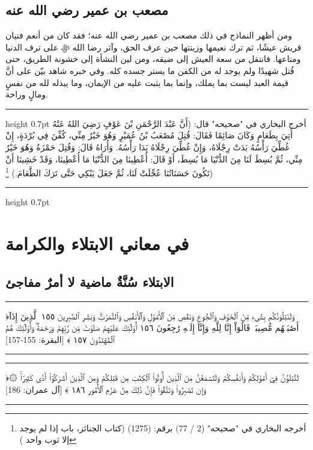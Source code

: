 \documentclass[12pt,openany]{book}
\newenvironment{quranblock}
  {\par\medskip\begin{center}\begin{minipage}{0.92\linewidth}\centering\quranfont\large\color{ink}\hrule\vspace{0.65em}}
  {\vspace{0.65em}\hrule\end{minipage}\end{center}\medskip}
\newenvironment{hadithblock}
  {\par\medskip\noindent\begin{minipage}{\linewidth}\hrule height 0.7pt \vspace{0.6em}\small}
  {\vspace{0.4em}\hrule height 0.7pt\end{minipage}\par\medskip}
\begin{document}
\section{مصعب بن عمير رضي الله عنه}
ومن أظهر النماذج في ذلك مصعب بن عمير رضي الله عنه؛ فقد كان من أنعم فتيان قريش عيشًا، ثم ترك نعيمها وزينتها حين عرف الحق، وآثر رضا الله ﷻ على ترف الدنيا ومتاعها. فانتقل من سعة العيش إلى ضيقه، ومن لين النشأة إلى خشونة الطريق، حتى قُتل شهيدًا ولم يوجد له من الكفن ما يستر جسده كله. وفي خبره شاهد بيّن على أنَّ قيمة العبد ليست بما يملك، وإنما بما يثبت عليه من الإيمان، وما يبذله لله من نفسٍ ومالٍ وراحة.

\begin{hadithblock}
أخرج البخاري في "صحيحه" قال: (أَنَّ عَبْدَ الرَّحْمَنِ بْنَ عَوْفٍ رَضِيَ اللهُ عَنْهُ أُتِيَ بِطَعَامٍ وَكَانَ صَائِمًا فَقَالَ: قُتِلَ مُصْعَبُ بْنُ عُمَيْرٍ وَهُوَ خَيْرٌ مِنِّي، كُفِّنَ فِي بُرْدَةٍ، إِنْ غُطِّيَ رَأْسُهُ بَدَتْ رِجْلَاهُ، وَإِنْ غُطِّيَ رِجْلَاهُ بَدَا رَأْسُهُ. وَأُرَاهُ قَالَ: وَقُتِلَ حَمْزَةُ وَهُوَ خَيْرٌ مِنِّي، ثُمَّ بُسِطَ لَنَا مِنَ الدُّنْيَا مَا بُسِطَ، أَوْ قَالَ: أُعْطِينَا مِنَ الدُّنْيَا مَا أُعْطِينَا، وَقَدْ خَشِينَا أَنْ تَكُونَ حَسَنَاتُنَا عُجِّلَتْ لَنَا، ثُمَّ جَعَلَ يَبْكِي حَتَّى تَرَكَ الطَّعَامَ.) \footnote{أخرجه البخاري في "صحيحه" (2 / 77) برقم: (1275) (كتاب الجنائز، باب إذا لم يوجد إلا ثوب واحد )})
\end{hadithblock}

\chapter{في معاني الابتلاء والكرامة}
\section{الابتلاء سُنَّةٌ ماضية لا أمرٌ مفاجئ}
\begin{quranblock}
﴿‌وَلَنَبۡلُوَنَّكُم بِشَيۡءٖ مِّنَ ٱلۡخَوۡفِ وَٱلۡجُوعِ وَنَقۡصٖ مِّنَ ٱلۡأَمۡوَٰلِ وَٱلۡأَنفُسِ وَٱلثَّمَرَٰتِۗ وَبَشِّرِ ٱلصَّٰبِرِينَ ١٥٥ ٱلَّذِينَ إِذَآ أَصَٰبَتۡهُم مُّصِيبَةٞ قَالُوٓاْ إِنَّا لِلَّهِ وَإِنَّآ إِلَيۡهِ رَٰجِعُونَ ١٥٦ أُوْلَٰٓئِكَ عَلَيۡهِمۡ صَلَوَٰتٞ مِّن رَّبِّهِمۡ وَرَحۡمَةٞۖ وَأُوْلَٰٓئِكَ هُمُ ٱلۡمُهۡتَدُونَ ١٥٧ ﴾ [البقرة: 155-157]
\end{quranblock}

\begin{quranblock}
﴿۞ لَتُبۡلَوُنَّ فِيٓ أَمۡوَٰلِكُمۡ وَأَنفُسِكُمۡ وَلَتَسۡمَعُنَّ مِنَ ٱلَّذِينَ أُوتُواْ ‌ٱلۡكِتَٰبَ مِن قَبۡلِكُمۡ وَمِنَ ٱلَّذِينَ أَشۡرَكُوٓاْ أَذٗى كَثِيرٗاۚ وَإِن تَصۡبِرُواْ وَتَتَّقُواْ فَإِنَّ ذَٰلِكَ مِنۡ عَزۡمِ ٱلۡأُمُورِ ١٨٦ ﴾ [آل عمران: 186]
\end{quranblock}
\end{document}
